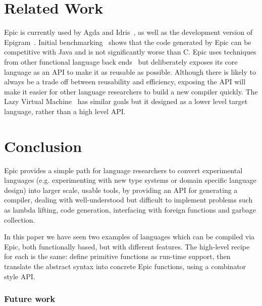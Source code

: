 \section{Related Work}


Epic is currently used by Agda and Idris~\cite{plpv11}, as well as the
development version of Epigram~\cite{levitation}. Initial
benchmarking~\cite{scrap-engine} shows that the code generated by Epic
can be competitive with Java and is not significantly worse than C.
Epic uses techniques from other functional language back
ends~\cite{evalpush,stg,abc-machine} but deliberately exposes its core
language as an API to make it as reusable as possible. Although there
is likely to always be a trade off between reusability and efficiency,
exposing the API will make it easier for other language researchers to
build a new compiler quickly. The Lazy Virtual Machine~\cite{lvm} has
similar goals but it designed as a lower level target language, rather
than a high level API. 


\section{Conclusion}

Epic provides a simple path for language researchers to convert
experimental languages (e.g. experimenting with new type systems or
domain specific language design) into larger scale, usable tools, by
providing an API for generating a compiler, dealing with
well-understood but difficult to implement problems such as lambda
lifting, code generation, interfacing with foreign functions and
garbage collection. 

In this paper we have seen two examples of languages which can be
compiled via Epic, both functionally based, but with different
features. The high-level recipe for each is the same: define primitive
functions as run-time support, then translate the abstract syntax into
concrete Epic functions, using a combinator style API.

\subsubsection{Future work}

